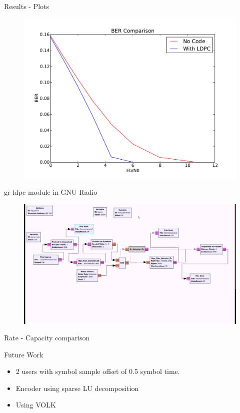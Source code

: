 \documentclass{beamer}
\begin{document}
\begin{frame}{Results - Plots}
 \begin{figure}
  \centering
  \includegraphics[scale=0.5]{ber_plot}
\end{figure}
\end{frame}

\begin{frame}{gr-ldpc module in GNU Radio}
  \begin{figure}
  \centering
  \includegraphics[scale=0.17]{ldpc}
\end{figure}
\end{frame}

\begin{frame}{Rate - Capacity comparison}
 
\end{frame}

\begin{frame}{Future Work}
 \begin{itemize} \itemsep 0.3cm
  \item 2 users with symbol sample offset of 0.5 symbol time.
  \item Encoder using sparse LU decomposition
  \item Using VOLK
 \end{itemize}

\end{frame}
\end{document}
